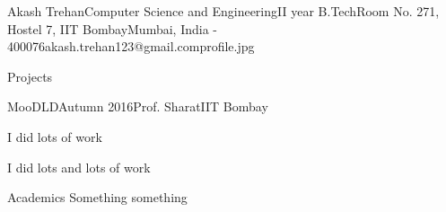 \documentclass{resume_ssl}
\begin{document}
\begin{Header}{Akash Trehan}{Computer Science and Engineering}{II year B.Tech}{Room No. 271, Hostel 7, IIT Bombay}{Mumbai, India - 400076}{akash.trehan123@gmail.com}{profile.jpg}
\end{Header}

\begin{Section}{Projects}
\begin{Subsection}{MooDLD}{Autumn 2016}{Prof. Sharat}{IIT Bombay}
{
    \item I did lots of work
    \item I did lots and lots of work
}
\end{Subsection}
\end{Section}


\begin{Section}{Academics}
Something something
\end{Section}
\end{document}
